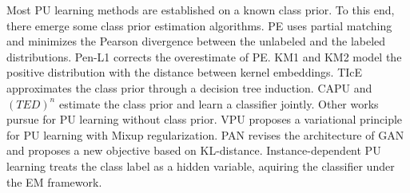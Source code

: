 \documentclass[final]{cvpr}
\newcommand{\bangyan}[1]{#1}
\begin{document}
Most PU learning methods are established on a known class prior. To this end, there emerge some class prior estimation algorithms. PE \cite{DBLP:conf/acml/PlessisNS15} uses partial matching and minimizes the Pearson divergence between the unlabeled and the labeled distributions. Pen-L1  \cite{DBLP:journals/ml/PlessisNS17} corrects the overestimate of PE. KM1 and KM2  \cite{DBLP:conf/icml/RamaswamyST16} model the positive distribution with the distance between kernel embeddings. TIcE \cite{DBLP:conf/aaai/BekkerD18} 
approximates the class prior through a decision tree induction. CAPU \cite{DBLP:conf/ijcai/Chang0Z20} and $(TED)^n$ \cite{DBLP:conf/nips/GargWSBL21} estimate the class prior and learn a classifier jointly. Other works pursue for PU learning without class prior. VPU \cite{DBLP:conf/nips/ChenLWZW20} proposes a variational principle for PU learning with Mixup regularization. PAN \cite{DBLP:conf/aaai/HuL0JM0021} revises the architecture of GAN and proposes a new objective based on KL-distance. Instance-dependent PU learning \cite{gong2021instance} treats the class label as a hidden variable, aquiring the classifier under the EM framework.

\end{document}

